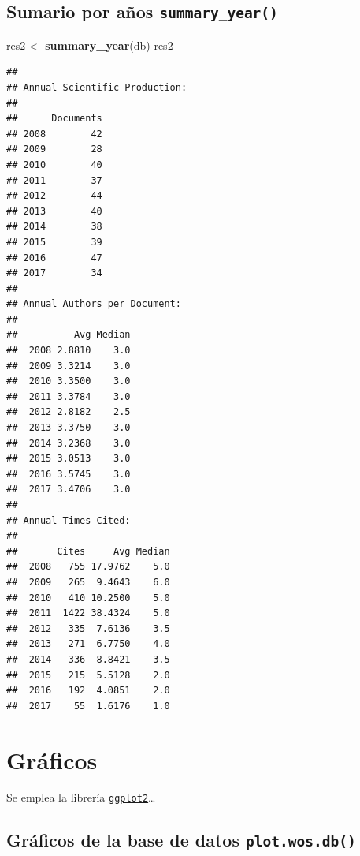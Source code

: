 \documentclass[
]{book}
\newenvironment{Shaded}{\begin{snugshade}}{\end{snugshade}}
\newcommand{\FunctionTok}[1]{\textcolor[rgb]{0.13,0.29,0.53}{\textbf{#1}}}
\newcommand{\NormalTok}[1]{#1}
\newcommand{\OtherTok}[1]{\textcolor[rgb]{0.56,0.35,0.01}{#1}}
\begin{document}
\hypertarget{sumario-por-auxf1os-summary_year}{%
\subsection{\texorpdfstring{Sumario por años \texttt{summary\_year()}}{Sumario por años summary\_year()}}\label{sumario-por-auxf1os-summary_year}}

\begin{Shaded}
\begin{Highlighting}[]
\NormalTok{res2 }\OtherTok{\textless{}{-}} \FunctionTok{summary\_year}\NormalTok{(db)}
\NormalTok{res2}
\end{Highlighting}
\end{Shaded}

\begin{verbatim}
## 
## Annual Scientific Production:
## 
##      Documents
## 2008        42
## 2009        28
## 2010        40
## 2011        37
## 2012        44
## 2013        40
## 2014        38
## 2015        39
## 2016        47
## 2017        34
## 
## Annual Authors per Document:
## 
##          Avg Median
##  2008 2.8810    3.0
##  2009 3.3214    3.0
##  2010 3.3500    3.0
##  2011 3.3784    3.0
##  2012 2.8182    2.5
##  2013 3.3750    3.0
##  2014 3.2368    3.0
##  2015 3.0513    3.0
##  2016 3.5745    3.0
##  2017 3.4706    3.0
## 
## Annual Times Cited:
## 
##       Cites     Avg Median
##  2008   755 17.9762    5.0
##  2009   265  9.4643    6.0
##  2010   410 10.2500    5.0
##  2011  1422 38.4324    5.0
##  2012   335  7.6136    3.5
##  2013   271  6.7750    4.0
##  2014   336  8.8421    3.5
##  2015   215  5.5128    2.0
##  2016   192  4.0851    2.0
##  2017    55  1.6176    1.0
\end{verbatim}

\hypertarget{gruxe1ficos}{%
\section{Gráficos}\label{gruxe1ficos}}

Se emplea la librería \href{https://ggplot2.tidyverse.org}{\texttt{ggplot2}}\ldots{}

\hypertarget{gruxe1ficos-de-la-base-de-datos-plot.wos.db}{%
\subsection{\texorpdfstring{Gráficos de la base de datos \texttt{plot.wos.db()}}{Gráficos de la base de datos plot.wos.db()}}\label{gruxe1ficos-de-la-base-de-datos-plot.wos.db}}
\end{document}
